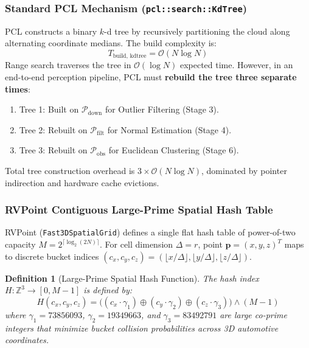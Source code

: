 \documentclass[journal,compsoc]{IEEEtran}
\newtheorem{definition}{Definition}
\begin{document}
\subsubsection{Standard PCL Mechanism (\texttt{pcl::search::KdTree})}
PCL constructs a binary $k$-d tree by recursively partitioning the cloud along alternating coordinate medians. The build complexity is:
\begin{equation}
T_{\text{build, kdtree}} = \mathcal{O}(N \log N)
\end{equation}
Range search traverses the tree in $\mathcal{O}(\log N)$ expected time. However, in an end-to-end perception pipeline, PCL must \textbf{rebuild the tree three separate times}:
\begin{enumerate}
    \item Tree 1: Built on $\mathcal{P}_{\text{down}}$ for Outlier Filtering (Stage 3).
    \item Tree 2: Rebuilt on $\mathcal{P}_{\text{filt}}$ for Normal Estimation (Stage 4).
    \item Tree 3: Rebuilt on $\mathcal{P}_{\text{obs}}$ for Euclidean Clustering (Stage 6).
\end{enumerate}
Total tree construction overhead is $3 \times \mathcal{O}(N \log N)$, dominated by pointer indirection and hardware cache evictions.

\subsubsection{RVPoint Contiguous Large-Prime Spatial Hash Table}
RVPoint (\texttt{Fast3DSpatialGrid}) defines a single flat hash table of power-of-two capacity $M = 2^{\lceil \log_2(2N) \rceil}$. For cell dimension $\Delta = r$, point $\bm{p} = (x, y, z)^T$ maps to discrete bucket indices $(c_x, c_y, c_z) = (\lfloor x/\Delta \rfloor, \lfloor y/\Delta \rfloor, \lfloor z/\Delta \rfloor)$.

\begin{definition}[Large-Prime Spatial Hash Function]
The hash index $H: \mathbb{Z}^3 \to [0, M-1]$ is defined by:
\begin{equation}
H(c_x, c_y, c_z) = \Big( (c_x \cdot \gamma_1) \oplus (c_y \cdot \gamma_2) \oplus (c_z \cdot \gamma_3) \Big) \land (M - 1)
\label{eq:hash_func}
\end{equation}
where $\gamma_1 = 73856093$, $\gamma_2 = 19349663$, and $\gamma_3 = 83492791$ are large co-prime integers that minimize bucket collision probabilities across 3D automotive coordinates.
\end{definition}
\end{document}
